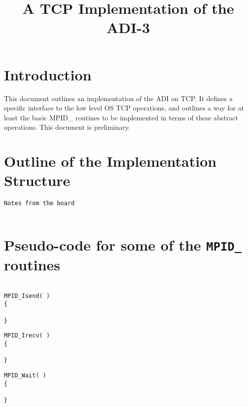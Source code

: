 \documentclass{article}
\def\code#1{\texttt{#1}}
\begin{document}
\title{A TCP Implementation of the ADI-3}
\author{}
\maketitle

\begin{abstract}

\end{abstract}

\section{Introduction}
This document outlines an implementation of the ADI on TCP.  It defines a
specific interface to the low level OS TCP operations, and outlines a way
for at least the basic MPID_ routines to be implemented in terms of these
abstract operations.  This document is preliminary.

\section{Outline of the Implementation Structure}

\begin{verbatim}
Notes from the board


\end{verbatim}

\section{Pseudo-code for some of the \code{MPID_} routines}

\begin{verbatim}

MPID_Isend( )
{

}
\end{verbatim}

\begin{verbatim}
MPID_Irecv( )
{

}
\end{verbatim}

\begin{verbatim}
MPID_Wait( )
{

}
\end{verbatim}

\begin{verbatim}

\end{verbatim}
\end{document}
